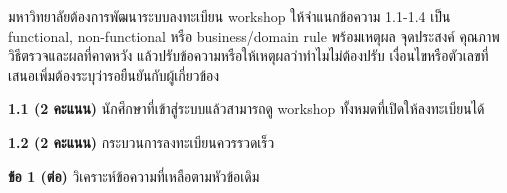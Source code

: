 มหาวิทยาลัยต้องการพัฒนาระบบลงทะเบียน workshop ให้จำแนกข้อความ 1.1-1.4 เป็น functional, non-functional หรือ business/domain rule พร้อมเหตุผล จุดประสงค์ คุณภาพ วิธีตรวจและผลที่คาดหวัง แล้วปรับข้อความหรือให้เหตุผลว่าทำไมไม่ต้องปรับ เงื่อนไขหรือตัวเลขที่เสนอเพิ่มต้องระบุว่ารอยืนยันกับผู้เกี่ยวข้อง\par

\textbf{1.1 (2 คะแนน)} นักศึกษาที่เข้าสู่ระบบแล้วสามารถดู workshop ทั้งหมดที่เปิดให้ลงทะเบียนได้\par
\blankbox{6.5cm}
\textbf{1.2 (2 คะแนน)} กระบวนการลงทะเบียนควรรวดเร็ว\par
\blankbox{6.5cm}
\newpage
\textbf{ข้อ 1 (ต่อ)} วิเคราะห์ข้อความที่เหลือตามหัวข้อเดิม\par

